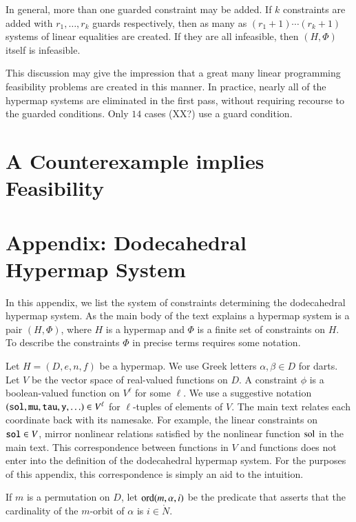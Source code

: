 In general, more than one guarded constraint may be added.  If
$k$ constraints are added with $r_1,\ldots,r_k$ guards
respectively, then as many as $(r_1+1)\cdots (r_k+1)$ systems
of linear equalities are created.  If they are all infeasible,
then $(H,\Phi)$ itself is infeasible.

This discussion may give the impression 
that a great many linear programming feasibility
problems are created in this manner.  In practice, nearly all
of the hypermap systems are eliminated in the first pass, without
requiring recourse to the guarded conditions.  Only
$14$ cases (XX?) use a guard condition.



\section{A Counterexample implies Feasibility}




\section{Appendix: Dodecahedral Hypermap System}

In this appendix, we list the system of constraints determining
the dodecahedral hypermap system.  As the main body of the text explains
a hypermap system is a pair $(H,\Phi)$, where $H$ is a hypermap
and $\Phi$ is a finite set of constraints on $H$.  To describe
the constraints $\Phi$ in precise terms requires some notation.

Let $H=(D,e,n,f)$ be a hypermap.  We use Greek letters
$\alpha,\beta \in D$ for darts.  Let $V$ be the vector space 
of real-valued  functions on $D$.  A constraint $\phi$ is a boolean-valued function on $V^\ell$ for some $\ell$.  We use a suggestive
notation $({\operatorname{{\texttt{sol}}}},{\operatorname{{\texttt{mu}}}},{\operatorname{{\texttt{tau}}}},{\operatorname{{\texttt{y}}}},\ldots)\in V^\ell$ for $\ell$-tuples
of elements of $V$.  The main text relates each coordinate back
with its namesake.  For example, the linear constraints on
${\operatorname{{\texttt{sol}}}}\in V$, mirror  nonlinear relations satisfied by the
nonlinear function $\operatorname{sol}$ in the main text.  This correspondence
between functions in $V$ and functions does not enter into the
definition of the dodecahedral hypermap system.  For the purposes of this
appendix, this correspondence is simply an aid to the
intuition.

If $m$ is  a permutation on $D$, let ${\operatorname{ord}}(m,\alpha,i)$
be the predicate that asserts that the cardinality of the $m$-orbit
of $\alpha$ is $i\in\ring{N}$.
\bigskip

